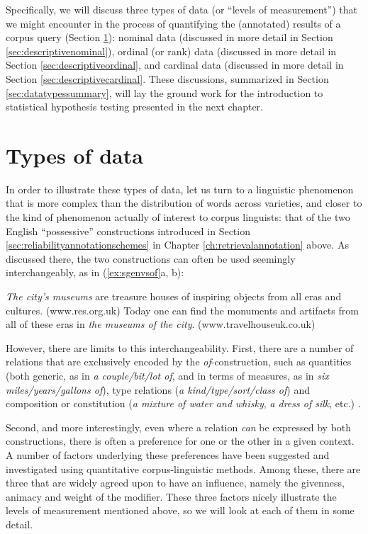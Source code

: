 Specifically, we will discuss three types of data (or ``levels of measurement'') that we might encounter in the process of quantifying the (annotated) results of a corpus query (Section \ref{sec:typesofdata}): nominal data (discussed in more detail in Section \ref{sec:descriptivenominal}), ordinal (or rank) data (discussed in more detail in Section \ref{sec:descriptiveordinal}, and cardinal data (discussed in more detail in Section \ref{sec:descriptivecardinal}. These discussions, summarized in Section \ref{sec:datatypessummary}, will lay the ground work for the introduction to statistical hypothesis testing presented in the next chapter.

\section{Types of data}
\label{sec:typesofdata}

In order to illustrate these types of data, let us turn to a linguistic phenomenon that is more complex than the distribution of words across varieties, and closer to the kind of phenomenon actually of interest to corpus linguists: that of the two English ``possessive'' constructions introduced in Section \ref{sec:reliabilityannotationschemes} in Chapter \ref{ch:retrievalannotation} above. As discussed there, the two constructions can often be used seemingly interchangeably, as in (\ref{ex:sgenvsof}a, b):

\begin{exe}
\ex
\begin{xlist} 
\label{ex:sgenvsof}
\ex \textit{The city's museums} are treasure houses of inspiring objects from all eras and cultures. (www.res.org.uk)
\ex Today one can find the monuments and artifacts from all of these eras in \textit{the museums of the city}. (www.travelhouseuk.co.uk)
\end{xlist}
\end{exe}

However, there are limits to this interchangeability. First, there are a number of relations that are exclusively encoded by the \textit{of}-construction, such as quantities (both generic, as in \textit{a couple/bit/lot of}, and in terms of measures, as in \textit{six miles/years/gallons of}), type relations (\textit{a kind/type/sort/class of}) and composition or constitution (\textit{a mixture of water and whisky}, \textit{a dress of silk}, etc.) \citep[cf. e.g.][]{rohdenburg_constructional_2003}.

Second, and more interestingly, even where a relation \textit{can} be expressed by both constructions, there is often a preference for one or the other in a given context. A number of factors underlying these preferences have been suggested and investigated using quantitative corpus-linguistic methods. Among these, there are three that are widely agreed upon to have an influence, namely the givenness, animacy and weight of the modifier. These three factors nicely illustrate the levels of measurement mentioned above, so we will look at each of them in some detail.

